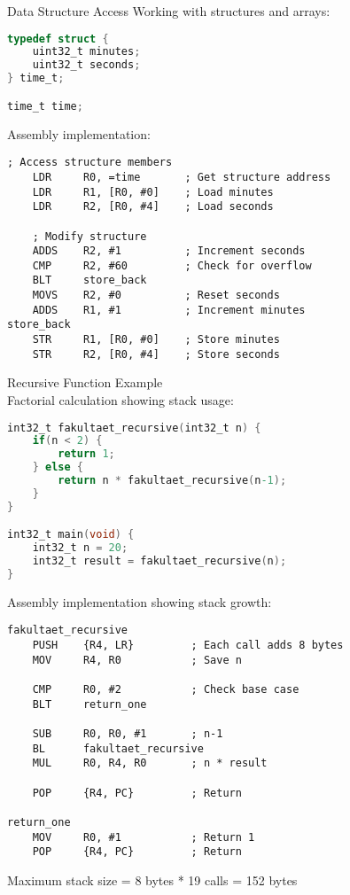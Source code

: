\begin{example2}{Data Structure Access}
Working with structures and arrays:
\begin{lstlisting}[language=C, style=basesmol]
typedef struct {
    uint32_t minutes;
    uint32_t seconds;
} time_t;

time_t time;
\end{lstlisting}

Assembly implementation:
\begin{lstlisting}[language=armasm, style=basesmol]
    ; Access structure members
    LDR     R0, =time       ; Get structure address
    LDR     R1, [R0, #0]    ; Load minutes
    LDR     R2, [R0, #4]    ; Load seconds
    
    ; Modify structure
    ADDS    R2, #1          ; Increment seconds
    CMP     R2, #60         ; Check for overflow
    BLT     store_back
    MOVS    R2, #0          ; Reset seconds
    ADDS    R1, #1          ; Increment minutes
store_back
    STR     R1, [R0, #0]    ; Store minutes
    STR     R2, [R0, #4]    ; Store seconds
\end{lstlisting}
\end{example2}

\begin{example2}{Recursive Function Example}\\
Factorial calculation showing stack usage:

\begin{lstlisting}[language=C, style=basesmol]
int32_t fakultaet_recursive(int32_t n) {
    if(n < 2) {
        return 1;
    } else {
        return n * fakultaet_recursive(n-1);
    }
}

int32_t main(void) {
    int32_t n = 20;
    int32_t result = fakultaet_recursive(n);
}
\end{lstlisting}

Assembly implementation showing stack growth:
\begin{lstlisting}[language=armasm, style=basesmol]
fakultaet_recursive
    PUSH    {R4, LR}         ; Each call adds 8 bytes
    MOV     R4, R0           ; Save n
    
    CMP     R0, #2           ; Check base case
    BLT     return_one
    
    SUB     R0, R0, #1       ; n-1
    BL      fakultaet_recursive
    MUL     R0, R4, R0       ; n * result
    
    POP     {R4, PC}         ; Return
    
return_one
    MOV     R0, #1           ; Return 1
    POP     {R4, PC}         ; Return
\end{lstlisting}

Maximum stack size = 8 bytes * 19 calls = 152 bytes
\end{example2}



